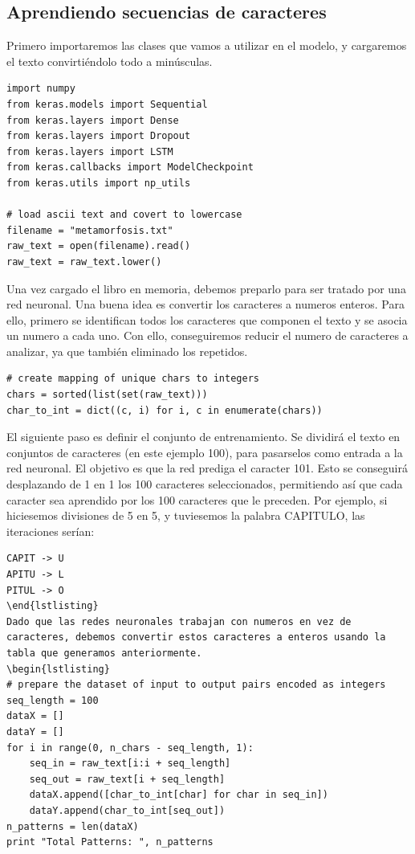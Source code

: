 \subsection{Aprendiendo secuencias de caracteres}
Primero importaremos las clases que vamos a utilizar en el modelo, y cargaremos el texto convirtiéndolo todo a minúsculas.
\begin{verbatim}
import numpy
from keras.models import Sequential
from keras.layers import Dense
from keras.layers import Dropout
from keras.layers import LSTM
from keras.callbacks import ModelCheckpoint
from keras.utils import np_utils

# load ascii text and covert to lowercase
filename = "metamorfosis.txt"
raw_text = open(filename).read()
raw_text = raw_text.lower()
\end{verbatim}
Una vez cargado el libro en memoria, debemos preparlo para ser tratado por una red neuronal. Una buena idea es convertir los caracteres a numeros enteros. Para ello, primero se identifican todos los caracteres que componen el texto y se asocia un numero a cada uno. Con ello, conseguiremos reducir el numero de caracteres a analizar, ya que también eliminado los repetidos.
\begin{verbatim}
# create mapping of unique chars to integers
chars = sorted(list(set(raw_text)))
char_to_int = dict((c, i) for i, c in enumerate(chars))
\end{verbatim}
El siguiente paso es definir el conjunto de entrenamiento. Se dividirá el texto en conjuntos de caracteres (en este ejemplo 100), para pasarselos como entrada a la red neuronal. El objetivo es que la red prediga el caracter 101. Esto se conseguirá desplazando de 1 en 1 los 100 caracteres seleccionados, permitiendo así que cada caracter sea aprendido por los 100 caracteres que le preceden. Por ejemplo, si hiciesemos divisiones de 5 en 5, y tuviesemos la palabra CAPITULO, las iteraciones serían:
\begin{verbatim}
CAPIT -> U
APITU -> L
PITUL -> O
\end{lstlisting}
Dado que las redes neuronales trabajan con numeros en vez de caracteres, debemos convertir estos caracteres a enteros usando la tabla que generamos anteriormente.
\begin{lstlisting}
# prepare the dataset of input to output pairs encoded as integers
seq_length = 100
dataX = []
dataY = []
for i in range(0, n_chars - seq_length, 1):
	seq_in = raw_text[i:i + seq_length]
	seq_out = raw_text[i + seq_length]
	dataX.append([char_to_int[char] for char in seq_in])
	dataY.append(char_to_int[seq_out])
n_patterns = len(dataX)
print "Total Patterns: ", n_patterns
\end{verbatim}
